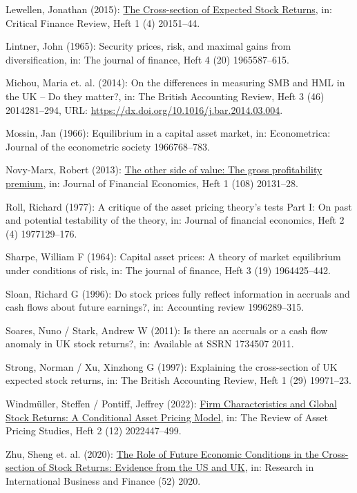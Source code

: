 \documentclass[a4paper,12pt]{article}
\begin{document}
\begin{CSLReferences}{1}{0}
\leavevmode{}%
Lewellen, Jonathan (2015): \href{https://doi.org/10.1561/104.00000024}{The Cross-section of Expected Stock Returns}, in: Critical Finance Review, Heft 1 (4) 20151--44.

\leavevmode{}%
Lintner, John (1965): Security prices, risk, and maximal gains from diversification, in: The journal of finance, Heft 4 (20) 1965587--615.

\leavevmode{}%
Michou, Maria et. al. (2014): On the differences in measuring SMB and HML in the UK -- Do they matter?, in: The British Accounting Review, Heft 3 (46) 2014281--294, URL: \url{https://dx.doi.org/10.1016/j.bar.2014.03.004}.

\leavevmode{}%
Mossin, Jan (1966): Equilibrium in a capital asset market, in: Econometrica: Journal of the econometric society 1966768--783.

\leavevmode{}%
Novy-Marx, Robert (2013): \href{https://doi.org/10.1016/j.jfineco.2013.01.003}{The other side of value: The gross profitability premium}, in: Journal of Financial Economics, Heft 1 (108) 20131--28.

\leavevmode{}%
Roll, Richard (1977): A critique of the asset pricing theory's tests Part I: On past and potential testability of the theory, in: Journal of financial economics, Heft 2 (4) 1977129--176.

\leavevmode{}%
Sharpe, William F (1964): Capital asset prices: A theory of market equilibrium under conditions of risk, in: The journal of finance, Heft 3 (19) 1964425--442.

\leavevmode{}%
Sloan, Richard G (1996): Do stock prices fully reflect information in accruals and cash flows about future earnings?, in: Accounting review 1996289--315.

\leavevmode{}%
Soares, Nuno / Stark, Andrew W (2011): Is there an accruals or a cash flow anomaly in UK stock returns?, in: Available at SSRN 1734507 2011.

\leavevmode{}%
Strong, Norman / Xu, Xinzhong G (1997): Explaining the cross-section of UK expected stock returns, in: The British Accounting Review, Heft 1 (29) 19971--23.

\leavevmode{}%
Windmüller, Steffen / Pontiff, Jeffrey (2022): \href{https://doi.org/10.1093/rapstu/raab024}{Firm Characteristics and Global Stock Returns: A Conditional Asset Pricing Model}, in: The Review of Asset Pricing Studies, Heft 2 (12) 2022447--499.

\leavevmode{}%
Zhu, Sheng et. al. (2020): \href{https://doi.org/10.1016/j.ribaf.2020.101193}{The Role of Future Economic Conditions in the Cross-section of Stock Returns: Evidence from the US and UK}, in: Research in International Business and Finance (52) 2020.

\end{CSLReferences}
\newpage
\end{document}
